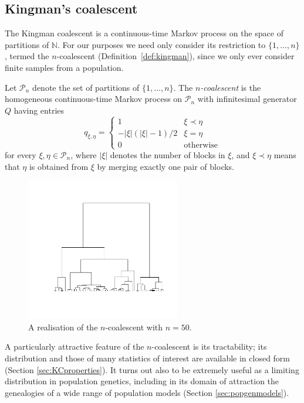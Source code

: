 \subsection{Kingman's coalescent}
\label{sec:KC}
The Kingman coalescent \parencite{kingman1982gene, kingman1982coal, kingman1982exch} is a continuous-time Markov process on the space of partitions of $\mathbb{N}$. For our purposes we need only consider its restriction to $\{1,\dots,n\}$, termed the $n$-coalescent (Definition~\ref{def:kingman}), since we only ever consider finite samples from a population. 
\begin{defn}%
\label{def:kingman}
Let $\mathcal{P}_n$ denote the set of partitions of $\{1,\dots,n\}$.
The \emph{$n$-coalescent} is the homogeneous continuous-time Markov process on $\mathcal{P}_n$ with infinitesimal generator $Q$ having entries
\begin{equation}\label{eq:KCgenerator}
q_{\xi,\eta} = \begin{cases}
1 & \xi \prec \eta\\
-|\xi|(|\xi|-1)/2 & \xi=\eta \\
0 & \text{otherwise}
\end{cases}
\end{equation}
for every $\xi, \eta \in \mathcal{P}_n$, where $|\xi|$ denotes the number of blocks in $\xi$, and $\xi \prec \eta$ means that $\eta$ is obtained from $\xi$ by merging exactly one pair of blocks.
\end{defn}
\begin{figure}
\centering
\includegraphics[width=0.6\textwidth, trim={2.8cm 3cm 1.5cm 2cm}, clip]{plots/ncoalescent.pdf}
\caption[The $n$-coalescent]{A realisation of the $n$-coalescent with $n=50$.}
\end{figure}
A particularly attractive feature of the $n$-coalescent is its tractability; its distribution and those of many statistics of interest are available in closed form (Section \ref{sec:KCproperties}).
It turns out also to be extremely useful as a limiting distribution in population genetics, including in its domain of attraction the genealogies of a wide range of population models (Section \ref{sec:popgenmodels}).


